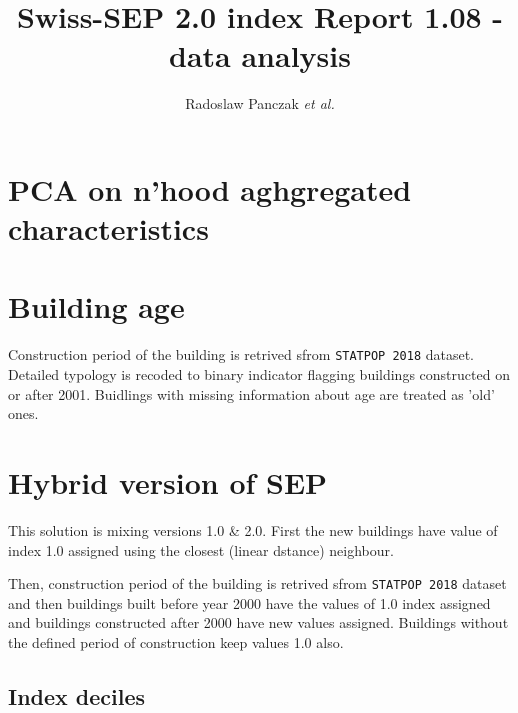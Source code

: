 \documentclass[a4paper, notitlepage, fleqn]{article} %
\title{\textbf{Swiss-SEP 2.0 index \endgraf 
Report 1.08 - data analysis}}
\author{Radoslaw Panczak \textit{et al.}}
\begin{document}
\maketitle
\tableofcontents

\newpage
\section{PCA on n'hood aghgregated characteristics}
\begin{stlog}\end{stlog}
\section{Building age}

Construction period of the building is retrived sfrom \texttt{STATPOP 2018} dataset. Detailed typology is recoded to binary indicator flagging 
buildings constructed on or after 2001. Buidlings with missing information about age are treated as 'old' ones. 
\begin{stlog}\end{stlog}
\newpage
\section{Hybrid version of SEP}

This solution is mixing versions 1.0 \& 2.0. First the new buildings have value of index 1.0 assigned using the closest (linear dstance) neighbour. 

Then, construction period of the building is retrived sfrom \texttt{STATPOP 2018} dataset and then buildings built before year 2000 have the values of 1.0 index assigned and buildings constructed after 2000 have new values assigned. Buildings without the defined period of construction keep values 1.0 also. 
\subsection{Index deciles}
\begin{stlog}\end{stlog}
\end{document}
